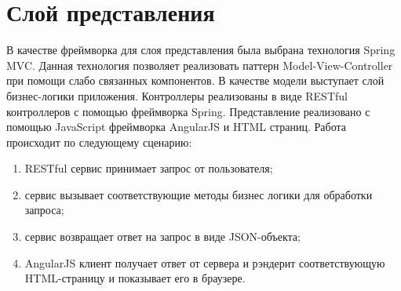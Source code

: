 \section{Слой представления}
	В качестве фреймворка для слоя представления была выбрана технология Spring MVC. Данная технология позволяет реализовать паттерн Model-View-Controller при помощи слабо связанных компонентов. В качестве модели выступает слой бизнес-логики приложения. Контроллеры реализованы в виде RESTful контроллеров с помощью фреймворка Spring. Представление реализовано с помощью JavaScript фреймворка AngularJS и HTML страниц. Работа происходит по следующему сценарию:
	\begin{enumerate}
		\item RESTful сервис принимает запрос от пользователя;
		\item сервис вызывает соответствующие методы бизнес логики для обработки запроса;
		\item сервис возвращает ответ на запрос в виде JSON-объекта;
		\item AngularJS клиент получает ответ от сервера и рэндерит соответствующую HTML-страницу и показывает его в браузере.
	\end{enumerate}
	
